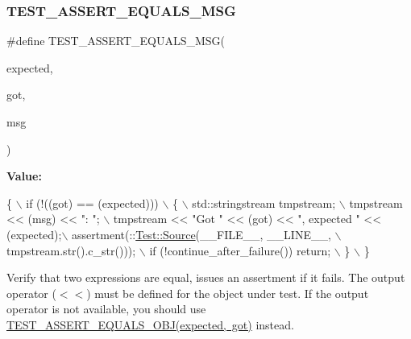 \mbox{\label{cpptest-assert_8h_ab8e9ce729f96abe74b76d98f9568a59c}} 
\subsubsection{\texorpdfstring{T\+E\+S\+T\+\_\+\+A\+S\+S\+E\+R\+T\+\_\+\+E\+Q\+U\+A\+L\+S\+\_\+\+M\+SG}{TEST\_ASSERT\_EQUALS\_MSG}}
{\footnotesize\ttfamily \#define T\+E\+S\+T\+\_\+\+A\+S\+S\+E\+R\+T\+\_\+\+E\+Q\+U\+A\+L\+S\+\_\+\+M\+SG(\begin{DoxyParamCaption}\item[{}]{expected,  }\item[{}]{got,  }\item[{}]{msg }\end{DoxyParamCaption})}

{\bfseries Value\+:}
\begin{DoxyCode}
\{                                                                   \(\backslash\)
        if (!((got) == (expected)))                                     \(\backslash\)
        \{                                                               \(\backslash\)
            std::stringstream tmpstream;                                \(\backslash\)
            tmpstream << (msg) << \textcolor{stringliteral}{": "};                                 \(\backslash\)
            tmpstream << \textcolor{stringliteral}{"Got "} << (got) << \textcolor{stringliteral}{", expected "} << (expected);\(\backslash\)
            assertment(::\mbox{\hyperlink{class_test_1_1_source}{Test::Source}}(\_\_FILE\_\_, \_\_LINE\_\_,               \(\backslash\)
                        tmpstream.str().c\_str()));                      \(\backslash\)
            if (!continue\_after\_failure()) return;                      \(\backslash\)
        \}                                                               \(\backslash\)
    \}
\end{DoxyCode}
Verify that two expressions are equal, issues an assertment if it fails. The output operator ($<$$<$) must be defined for the object under test. If the output operator is not available, you should use \mbox{\hyperlink{cpptest-assert_8h_aa506d98e8a5fc575df0361906f7deef8}{T\+E\+S\+T\+\_\+\+A\+S\+S\+E\+R\+T\+\_\+\+E\+Q\+U\+A\+L\+S\+\_\+\+O\+B\+J(expected, got)}} instead.


